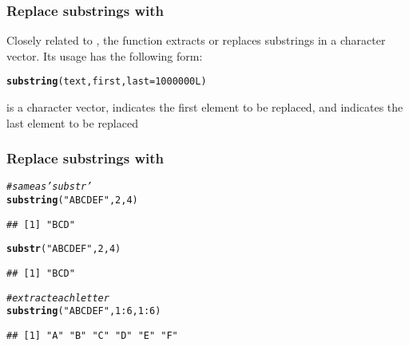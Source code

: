 \documentclass[12pt]{beamer}\usepackage[]{graphicx}\usepackage[]{color}
\makeatletter
\newcommand{\hlnum}[1]{\textcolor[rgb]{0.686,0.059,0.569}{#1}}%
\newcommand{\hlstr}[1]{\textcolor[rgb]{0.192,0.494,0.8}{#1}}%
\newcommand{\hlcom}[1]{\textcolor[rgb]{0.678,0.584,0.686}{\textit{#1}}}%
\newcommand{\hlopt}[1]{\textcolor[rgb]{0,0,0}{#1}}%
\newcommand{\hlstd}[1]{\textcolor[rgb]{0.345,0.345,0.345}{#1}}%
\newcommand{\hlkwc}[1]{\textcolor[rgb]{0.333,0.667,0.333}{#1}}%
\newcommand{\hlkwd}[1]{\textcolor[rgb]{0.737,0.353,0.396}{\textbf{#1}}}%
\newenvironment{kframe}{%
 \def\at@end@of@kframe{}%
 \ifinner\ifhmode%
  \def\at@end@of@kframe{\end{minipage}}%
  \begin{minipage}{\columnwidth}%
 \fi\fi%
 \def\FrameCommand##1{\hskip\@totalleftmargin \hskip-\fboxsep
 \colorbox{shadecolor}{##1}\hskip-\fboxsep
     \hskip-\linewidth \hskip-\@totalleftmargin \hskip\columnwidth}%
 \MakeFramed {\advance\hsize-\width
   \@totalleftmargin\z@ \linewidth\hsize
   \@setminipage}}%
 {\par\unskip\endMakeFramed%
 \at@end@of@kframe}
\newenvironment{knitrout}{}{} %
\makeatother
\begin{document}

\begin{frame}[fragile]
\frametitle{Replace substrings with }

Closely related to , the function {\hilit {}} extracts or replaces substrings in a character vector. Its usage has the following form:
\begin{knitrout}\footnotesize
{}\color{fgcolor}\begin{kframe}
\begin{alltt}
\hlkwd{substring}\hlstd{(text, first,} \hlkwc{last} \hlstd{=} \hlnum{1000000L}\hlstd{)}
\end{alltt}
\end{kframe}
\end{knitrout}

 is a character vector,  indicates the first element to be replaced, and  indicates the last element to be replaced

\end{frame}


\begin{frame}[fragile]
\frametitle{Replace substrings with }

\begin{knitrout}\footnotesize
{}\color{fgcolor}\begin{kframe}
\begin{alltt}
\hlcom{# same as 'substr'}
\hlkwd{substring}\hlstd{(}\hlstr{"ABCDEF"}\hlstd{,} \hlnum{2}\hlstd{,} \hlnum{4}\hlstd{)}
\end{alltt}
\begin{verbatim}
## [1] "BCD"
\end{verbatim}
\begin{alltt}
\hlkwd{substr}\hlstd{(}\hlstr{"ABCDEF"}\hlstd{,} \hlnum{2}\hlstd{,} \hlnum{4}\hlstd{)}
\end{alltt}
\begin{verbatim}
## [1] "BCD"
\end{verbatim}
\begin{alltt}
\hlcom{# extract each letter}
\hlkwd{substring}\hlstd{(}\hlstr{"ABCDEF"}\hlstd{,} \hlnum{1}\hlopt{:}\hlnum{6}\hlstd{,} \hlnum{1}\hlopt{:}\hlnum{6}\hlstd{)}
\end{alltt}
\begin{verbatim}
## [1] "A" "B" "C" "D" "E" "F"
\end{verbatim}
\end{kframe}
\end{knitrout}

\end{frame}
\end{document}
